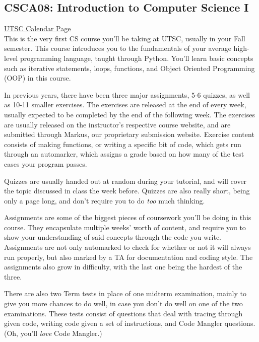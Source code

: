 \documentclass[11pt]{article}
\begin{document}
\subsection{CSCA08: Introduction to Computer Science I}

\href{https://utsc.calendar.utoronto.ca/course/CSCA08H3}{UTSC Calendar Page}\\

This is the very first CS course you'll be taking at UTSC, usually in your Fall semester.  This course introduces you to the fundamentals of your average high-level programming language, taught through Python.  You'll learn basic concepts such as iterative statements, loops, functions, and Object Oriented Programming (OOP) in this course.\par  
In previous years, there have been three major assignments, 5-6 quizzes, as well as 10-11 smaller exercises.  The exercises are released at the end of every week, usually expected to be completed by the end of the following week.  The exercises are usually released on the instructor's respective course website, and are submitted through Markus, our proprietary submission website.  Exercise content consists of making functions, or writing a specific bit of code, which gets run through an automarker, which assigns a grade based on how many of the test cases your program passes.\par
Quizzes are usually handed out at random during your tutorial, and will cover the topic discussed in class the week before.  Quizzes are also really short, being only a page long, and don't require you to do \textit{too} much thinking.\par
Assignments are some of the biggest pieces of coursework you'll be doing in this course.  They encapsulate multiple weeks' worth of content, and require you to show your understanding of said concepts through the code you write.  Assignments are not only automarked to check for whether or not it will always run properly, but also marked by a TA for documentation and coding style.  The assignments also grow in difficulty, with the last one being the hardest of the three. \par
There are also two Term tests in place of one midterm examination, mainly to give you more chances to do well, in case you don't do well on one of the two examinations.  These tests consist of questions that deal with tracing through given code, writing code given a set of instructions, and Code Mangler questions. (Oh, you'll \textit{love} Code Mangler.)\par
\end{document}
